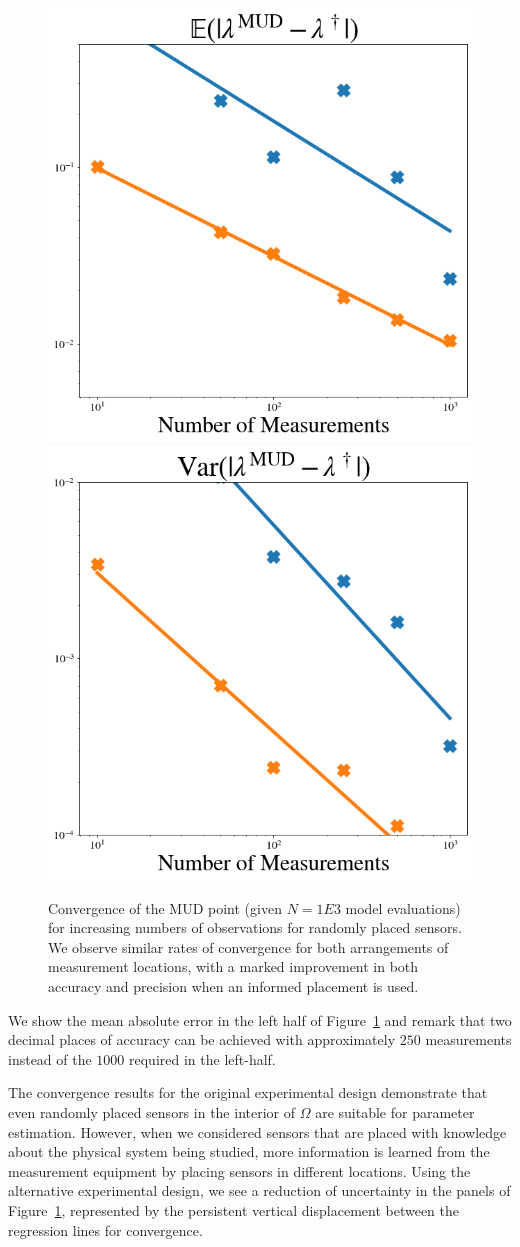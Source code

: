 \begin{figure}
  \centering
  \includegraphics[width=0.475\linewidth]{figures/pde/pde_convergence_mud_obs_mean}
  \includegraphics[width=0.475\linewidth]{figures/pde/pde_convergence_mud_obs_var}
  \caption{Convergence of the MUD point (given $N=1E3$ model evaluations) for increasing numbers of observations for randomly placed sensors.
  We observe similar rates of convergence for both arrangements of measurement locations, with a marked improvement in both accuracy and precision when an informed placement is used.
  }
  \label{fig:pde-convergence-obs}
\end{figure}

We show the mean absolute error in the left half of Figure~\ref{fig:pde-convergence-obs} and remark that two decimal places of accuracy can be achieved with approximately $250$ measurements instead of the $1000$ required in the left-half.

The convergence results for the original experimental design demonstrate that even randomly placed sensors in the interior of $\Omega$ are suitable for parameter estimation.
However, when we considered sensors that are placed with knowledge about the physical system being studied, more information is learned from the measurement equipment by placing sensors in different locations.
Using the alternative experimental design, we see a reduction of uncertainty in the panels of Figure~\ref{fig:pde-convergence-obs}, represented by the persistent vertical displacement between the regression lines for convergence.


